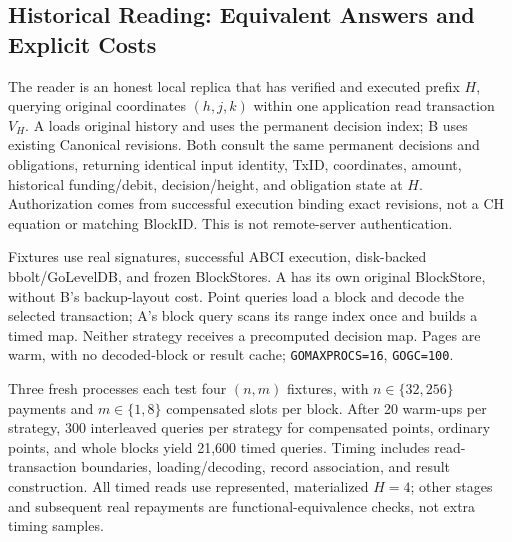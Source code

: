 \subsection{Historical Reading: Equivalent Answers and Explicit Costs}
\label{sec:eval-reader}

The reader is an honest local replica that has verified and executed
prefix $H$, querying original coordinates $(h,j,k)$ within one
application read transaction $V_H$. A loads original history and uses
the permanent decision index; B uses existing Canonical revisions.
Both consult the same permanent decisions and obligations, returning
identical input identity, TxID, coordinates, amount, historical
funding/debit, decision/height, and obligation state at $H$.
Authorization comes from successful execution binding exact revisions,
not a CH equation or matching BlockID. This is not remote-server
authentication.

Fixtures use real signatures, successful ABCI execution, disk-backed
bbolt/GoLevelDB, and frozen BlockStores. A has its own original
BlockStore, without B's backup-layout cost. Point queries load a block
and decode the selected transaction; A's block query scans its range
index once and builds a timed map. Neither strategy receives a
precomputed decision map. Pages are warm, with no decoded-block or
result cache; \texttt{GOMAXPROCS=16}, \texttt{GOGC=100}.

Three fresh processes each test four $(n,m)$ fixtures, with
$n\in\{32,256\}$ payments and $m\in\{1,8\}$ compensated slots per block.
After 20 warm-ups per strategy, 300 interleaved queries per strategy
for compensated points, ordinary points, and whole blocks yield
21,600 timed queries. Timing includes read-transaction boundaries,
loading/decoding, record association, and result construction.
All timed reads use represented, materialized $H=4$; other stages
and subsequent real repayments are functional-equivalence checks,
not extra timing samples.

